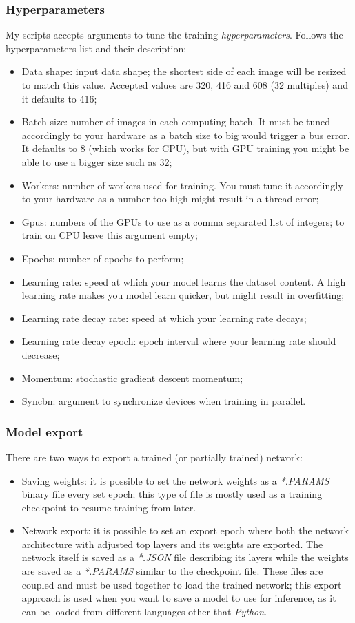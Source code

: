 \subsubsection{Hyperparameters}
My scripts accepts arguments to tune the training \emph{hyperparameters}. Follows the hyperparameters list and their description:
\begin{itemize}
	\item Data shape: input data shape; the shortest side of each image will be resized to match this value. Accepted values are 320, 416 and 608 (32 multiples) and it defaults to 416;
	\item Batch size: number of images in each computing batch. It must be tuned accordingly to your hardware as a batch size to big would trigger a bus error. It defaults to 8 (which works for CPU), but with GPU training you might be able to use a bigger size such as 32;
	\item Workers: number of workers used for training. You must tune it accordingly to your hardware as a number too high might result in a thread error;
	\item Gpus: numbers of the GPUs to use as a comma separated list of integers; to train on CPU leave this argument empty;
	\item Epochs: number of epochs to perform;
	\item Learning rate: speed at which your model learns the dataset content. A high learning rate makes you model learn quicker, but might result in overfitting;
	\item Learning rate decay rate: speed at which your learning rate decays;
	\item Learning rate decay epoch: epoch interval where your learning rate should decrease;
	\item Momentum: stochastic gradient descent momentum;
	\item Syncbn: argument to synchronize devices when training in parallel.
\end{itemize}


\subsubsection{Model export}
There are two ways to export a trained (or partially trained) network:
\begin{itemize}
	\item Saving weights: it is possible to set the network weights as a \emph{*.PARAMS} binary file every set epoch; this type of file is mostly used as a training checkpoint to resume training from later.
	\item Network export: it is possible to set an export epoch where both the network architecture with adjusted top layers and its weights are exported. The network itself is saved as a \emph{*.JSON} file describing its layers while the weights are saved as a \emph{*.PARAMS} similar to the checkpoint file. These files are coupled and must be used together to load the trained network; this export approach is used when you want to save a model to use for inference, as it can be loaded from different languages other that \emph{Python}.
\end{itemize}

